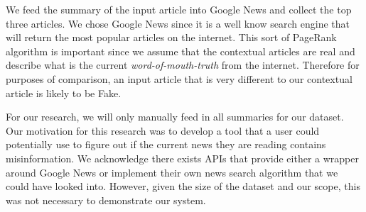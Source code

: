 \documentclass{article}
\begin{document}

We feed the summary of the input article into Google News and collect the top three articles. We chose Google News since it is a well know search engine that will return the most popular articles on the internet. This sort of PageRank algorithm is important since we assume that the contextual articles are real and describe what is the current \emph{word-of-mouth-truth} from the internet. Therefore for purposes of comparison, an input article that is very different to our contextual article is likely to be Fake.

For our research, we will only manually feed in all summaries for our dataset. Our motivation for this research was to develop a tool that a user could potentially use to figure out if the current news they are reading contains misinformation. We acknowledge there exists APIs that provide either a wrapper around Google News or implement their own news search algorithm that we could have looked into. However, given the size of the dataset and our scope, this was not necessary to demonstrate our system.
\end{document}
